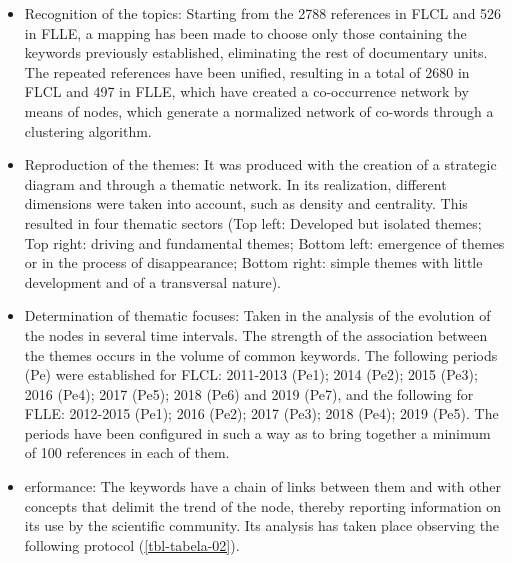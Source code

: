 \documentclass{textolivre-html}
\begin{document}
\begin{itemize}
    \item Recognition of the topics: Starting from the 2788 references in FLCL and 526 in FLLE, a mapping has been made to choose only those containing the keywords previously established, eliminating the rest of documentary units. The repeated references have been unified, resulting in a total of 2680 in FLCL and 497 in FLLE, which have created a co-occurrence network by means of nodes, which generate a normalized network of co-words through a clustering algorithm.
    \item Reproduction of the themes: It was produced with the creation of a strategic diagram and through a thematic network. In its realization, different dimensions were taken into account, such as density and centrality. This resulted in four thematic sectors (Top left: Developed but isolated themes; Top right: driving and fundamental themes; Bottom left: emergence of themes or in the process of disappearance; Bottom right: simple themes with little development and of a transversal nature).
    \item Determination of thematic focuses: Taken in the analysis of the evolution of the nodes in several time intervals. The strength of the association between the themes occurs in the volume of common keywords. The following periods (Pe) were established for FLCL: 2011-2013 (Pe1); 2014 (Pe2); 2015 (Pe3); 2016 (Pe4); 2017 (Pe5); 2018 (Pe6) and 2019 (Pe7), and the following for FLLE: 2012-2015 (Pe1); 2016 (Pe2); 2017 (Pe3); 2018 (Pe4); 2019 (Pe5). The periods have been configured in such a way as to bring together a minimum of 100 references in each of them.
    \item erformance: The keywords have a chain of links between them and with other concepts that delimit the trend of the node, thereby reporting information on its use by the scientific community. Its analysis has taken place observing the following protocol (\cref{tbl-tabela-02}).
\end{itemize}

\end{document}
